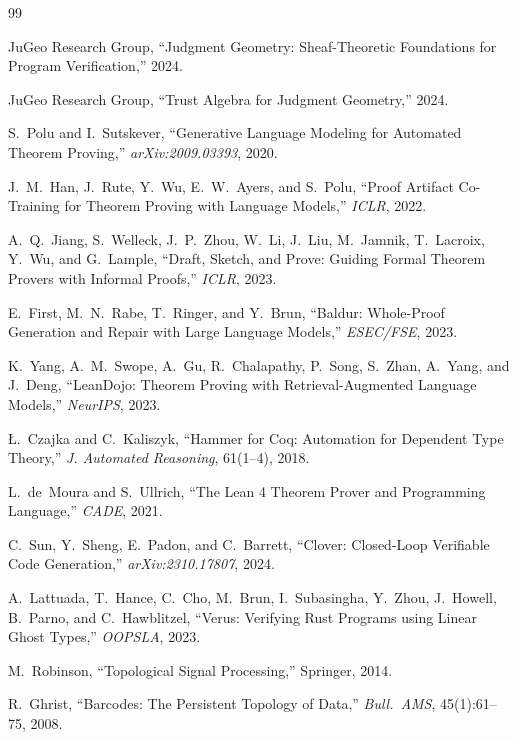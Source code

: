 \documentclass[11pt]{article}
\begin{document}
\begin{thebibliography}{99}

JuGeo Research Group, ``Judgment Geometry: Sheaf-Theoretic Foundations
for Program Verification,'' 2024.

JuGeo Research Group, ``Trust Algebra for Judgment Geometry,'' 2024.

S.~Polu and I.~Sutskever, ``Generative Language Modeling for Automated
Theorem Proving,'' \emph{arXiv:2009.03393}, 2020.

J.~M.~Han, J.~Rute, Y.~Wu, E.~W.~Ayers, and S.~Polu,
``Proof Artifact Co-Training for Theorem Proving with Language
Models,'' \emph{ICLR}, 2022.

A.~Q.~Jiang, S.~Welleck, J.~P.~Zhou, W.~Li, J.~Liu, M.~Jamnik,
T.~Lacroix, Y.~Wu, and G.~Lample,
``Draft, Sketch, and Prove: Guiding Formal Theorem Provers with
Informal Proofs,'' \emph{ICLR}, 2023.

E.~First, M.~N.~Rabe, T.~Ringer, and Y.~Brun,
``Baldur: Whole-Proof Generation and Repair with Large Language
Models,'' \emph{ESEC/FSE}, 2023.

K.~Yang, A.~M.~Swope, A.~Gu, R.~Chalapathy, P.~Song, S.~Zhan,
A.~Yang, and J.~Deng,
``LeanDojo: Theorem Proving with Retrieval-Augmented Language
Models,'' \emph{NeurIPS}, 2023.

\L.~Czajka and C.~Kaliszyk,
``Hammer for Coq: Automation for Dependent Type Theory,''
\emph{J. Automated Reasoning}, 61(1--4), 2018.

L.~de~Moura and S.~Ullrich, ``The Lean 4 Theorem Prover and
Programming Language,'' \emph{CADE}, 2021.

C.~Sun, Y.~Sheng, E.~Padon, and C.~Barrett,
``Clover: Closed-Loop Verifiable Code Generation,''
\emph{arXiv:2310.17807}, 2024.

A.~Lattuada, T.~Hance, C.~Cho, M.~Brun, I.~Subasingha, Y.~Zhou,
J.~Howell, B.~Parno, and C.~Hawblitzel,
``Verus: Verifying Rust Programs using Linear Ghost Types,''
\emph{OOPSLA}, 2023.

M.~Robinson, ``Topological Signal Processing,''
Springer, 2014.

R.~Ghrist, ``Barcodes: The Persistent Topology of Data,''
\emph{Bull.\ AMS}, 45(1):61--75, 2008.


\end{thebibliography}
\end{document}

